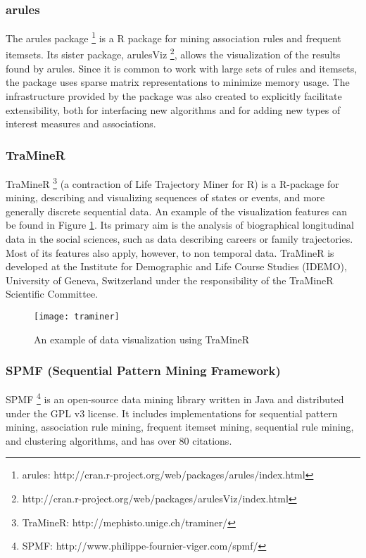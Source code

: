 \subsubsection*{arules}
The arules package \footnote{arules: http://cran.r-project.org/web/packages/arules/index.html} is a R package for mining association rules and frequent itemsets. Its sister package, arulesViz \footnote{http://cran.r-project.org/web/packages/arulesViz/index.html}, allows the visualization of the results found by arules. Since it is common to work with large sets of rules and itemsets, the package uses sparse matrix representations to minimize memory usage. The infrastructure provided by the package was also created to explicitly facilitate extensibility, both for interfacing new algorithms and for adding new types of interest measures and associations.

\subsubsection*{TraMineR}
TraMineR \footnote{TraMineR: http://mephisto.unige.ch/traminer/} (a contraction of Life Trajectory Miner for R) is a R-package for mining, describing and visualizing sequences of states or events, and more generally discrete sequential data. An example of the visualization features can be found in Figure \ref{fig:traminer}. Its primary aim is the analysis of biographical longitudinal data in the social sciences, such as data describing careers or family trajectories. Most of its features also apply, however, to non temporal data. TraMineR is developed at the Institute for Demographic and Life Course Studies (IDEMO), University of Geneva, Switzerland under the responsibility of the TraMineR Scientific Committee. 

\begin{figure}[htb]
  \begin{center}
    \leavevmode
    \texttt{[image: traminer]}
	\caption{An example of data visualization using TraMineR}
    \label{fig:traminer}
  \end{center}
\end{figure}

\subsubsection{SPMF (Sequential Pattern Mining Framework)}
SPMF \footnote{SPMF: http://www.philippe-fournier-viger.com/spmf/} is an open-source data mining library written in Java and distributed under the GPL v3 license. It includes implementations for sequential pattern mining, association rule mining, frequent itemset mining, sequential rule mining, and clustering algorithms, and has over 80 citations.

